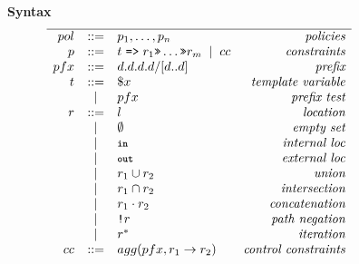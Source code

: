\documentclass[twocolumn]{sig-alternate-10pt}
\newcommand{\KW}[1]{\texttt{\small\bfseries{#1}}}
\newcommand{\Prefer}{\texttt{>>}}
\newcommand{\Path}{\texttt{=>}}
\newcommand{\In}{\KW{in}}
\newcommand{\Out}{\KW{out}}
\newcommand{\NOT}{\texttt{!}}
\newcommand{\BNFALT}{\;\;|\;\;}
\newcommand{\hdr}[2]{\flushleft \chdr{\hspace{5mm}#1}{#2}}
\newcommand{\chdr}[2]{\textbf{#1} {#2} \\ \centering}%
\begin{document}
\begin{figure*}[h!]\small
  \begin{minipage}[t]{.45\linewidth}
  \hdr{Syntax}{}
  \vspace*{-1\baselineskip}
  \[ \begin{array}{rclr}
    \hline%

     pol     &::=& p_1, \dots, p_n & \textit{policies} \\
     p       &::=& t \hspace{.3em} \Path \hspace{.3em} r_1 \Prefer \dots \Prefer r_m \BNFALT cc & \textit{constraints} \\
     pfx     &::=& d.d.d.d/[d..d] & \textit{prefix} \\
     t       &::=& \$x & \textit{template variable} \\
         &\BNFALT& pfx & \textit{prefix test} \\
     r       &::=& l & \textit{location} \\
         &\BNFALT& \emptyset & \textit{empty set} \\
         &\BNFALT& \In & \textit{internal loc} \\
         &\BNFALT& \Out & \textit{external loc} \\
         &\BNFALT& r_1 \cup r_2 & \textit{union} \\
         &\BNFALT& r_1 \cap r_2 & \textit{intersection} \\
         &\BNFALT& r_1 \cdot r_2 & \textit{concatenation} \\
         &\BNFALT& \NOT r & \textit{path negation} \\
         &\BNFALT& r^* & \textit{iteration} \\
     cc     &::=& agg(pfx, r_1 \rightarrow r_2)  & \textit{control constraints} \\
  \end{array} \]%


\end{minipage}
\end{figure*}
\end{document}
